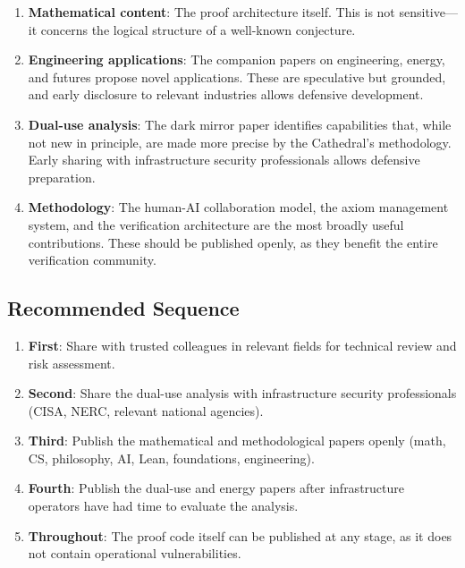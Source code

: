 \documentclass[11pt,a4paper]{article}
\begin{document}
\begin{enumerate}
  \item \textbf{Mathematical content}: The proof architecture
    itself. This is not sensitive---it concerns the logical
    structure of a well-known conjecture.

  \item \textbf{Engineering applications}: The companion papers
    on engineering, energy, and futures propose novel applications.
    These are speculative but grounded, and early disclosure to
    relevant industries allows defensive development.

  \item \textbf{Dual-use analysis}: The dark mirror paper identifies
    capabilities that, while not new in principle, are made more
    precise by the Cathedral's methodology. Early sharing with
    infrastructure security professionals allows defensive
    preparation.

  \item \textbf{Methodology}: The human-AI collaboration model,
    the axiom management system, and the verification architecture
    are the most broadly useful contributions. These should be
    published openly, as they benefit the entire verification
    community.
\end{enumerate}

\subsection{Recommended Sequence}

\begin{enumerate}
  \item \textbf{First}: Share with trusted colleagues in relevant
    fields for technical review and risk assessment.
  \item \textbf{Second}: Share the dual-use analysis with
    infrastructure security professionals (CISA, NERC, relevant
    national agencies).
  \item \textbf{Third}: Publish the mathematical and methodological
    papers openly (math, CS, philosophy, AI, Lean, foundations,
    engineering).
  \item \textbf{Fourth}: Publish the dual-use and energy papers
    after infrastructure operators have had time to evaluate the
    analysis.
  \item \textbf{Throughout}: The proof code itself can be published
    at any stage, as it does not contain operational vulnerabilities.
\end{enumerate}
\end{document}
